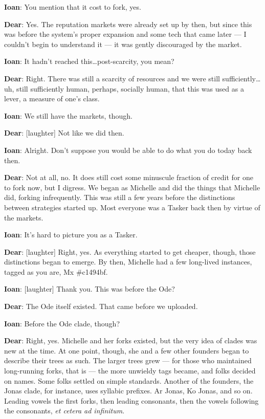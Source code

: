 \textbf{Ioan}: You mention that it cost to fork, yes.

\textbf{Dear}: Yes. The reputation markets were already set up by then, but since this was before the system's proper expansion and some tech that came later — I couldn't begin to understand it — it was gently discouraged by the market.

\textbf{Ioan}: It hadn't reached this\ldots{}post-scarcity, you mean?

\textbf{Dear}: Right. There was still a scarcity of resources and we were still sufficiently\ldots{}uh, still sufficiently human, perhaps, socially human, that this was used as a lever, a measure of one's class.

\textbf{Ioan}: We still have the markets, though.

\textbf{Dear}: {[}laughter{]} Not like we did then.

\textbf{Ioan}: Alright. Don't suppose you would be able to do what you do today back then.

\textbf{Dear}: Not at all, no. It does still cost some minuscule fraction of credit for one to fork now, but I digress. We began as Michelle and did the things that Michelle did, forking infrequently. This was still a few years before the distinctions between strategies started up. Most everyone was a Tasker back then by virtue of the markets.

\textbf{Ioan}: It's hard to picture you as a Tasker.

\textbf{Dear}: {[}laughter{]} Right, yes. As everything started to get cheaper, though, those distinctions began to emerge. By then, Michelle had a few long-lived instances, tagged as you are, Mx \#c1494bf.

\textbf{Ioan}: {[}laughter{]} Thank you. This was before the Ode?

\textbf{Dear}: The Ode itself existed. That came before we uploaded.

\textbf{Ioan}: Before the Ode clade, though?

\textbf{Dear}: Right, yes. Michelle and her forks existed, but the very idea of clades was new at the time. At one point, though, she and a few other founders began to describe their trees as such. The larger trees grew — for those who maintained long-running forks, that is — the more unwieldy tags became, and folks decided on names. Some folks settled on simple standards. Another of the founders, the Jonas clade, for instance, uses syllabic prefixes. Ar Jonas, Ko Jonas, and so on. Leading vowels the first forks, then leading consonants, then the vowels following the consonants, \emph{et cetera ad infinitum}.

